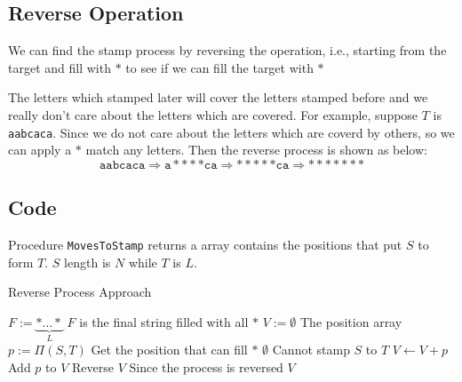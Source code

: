 \subsection{Reverse Operation}
We can find the stamp process by reversing the operation, i.e., starting from the target and fill with $\ast$ to see if we can fill the target with $\ast$
\par
The letters which stamped later will cover the letters stamped before and we really don't care about the letters which are covered. For example, suppose $T$ is \texttt{aabcaca}. Since we do not care about the letters which are coverd by others, so we can apply a $\ast$ match any letters. Then the reverse process is shown as below:
\[
\texttt{aabcaca} \Rightarrow \texttt{a}\ast\ast\ast\ast\texttt{ca} \Rightarrow \ast\ast\ast\ast\ast\texttt{ca} \Rightarrow \ast\ast\ast\ast\ast\ast\ast
\]
\subsection{Code}
Procedure \texttt{MovesToStamp} returns a array contains the positions that put $S$ to form $T$. $S$ length is $N$ while $T$ is $L$.
\setcounter{algorithm}{0}
\begin{algorithm}[H]
\caption{Reverse Process Approach}
\begin{algorithmic}[1]
\State $F:=\underbrace{\ast\ldots\ast}_{L}$ \Comment $F$ is the final string filled with all $\ast$
\State $V:=\emptyset$ \Comment The position array 
\State $p:=\Pi(S, T)$ \Comment Get the position that can fill $\ast$
\State \Return $\emptyset$ \Comment Cannot stamp $S$ to $T$
\Else
\State $V\gets V+p$ \Comment Add $p$ to $V$
\EndIf
\EndWhile
\State Reverse $V$ \Comment Since the process is reversed
\State \Return $V$
\EndProcedure
\end{algorithmic}
\end{algorithm}

